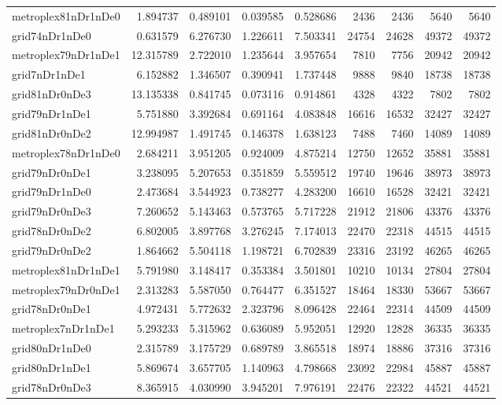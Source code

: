 \begin{longtable}{|l|r|r|r|r|r|r|r|r|}
metroplex81nDr1nDe0 & 1.894737 & 0.489101 & 0.039585 & 0.528686 & 2436 & 2436 & 5640 & 5640 \\
grid74nDr1nDe0 & 0.631579 & 6.276730 & 1.226611 & 7.503341 & 24754 & 24628 & 49372 & 49372 \\
metroplex79nDr1nDe1 & 12.315789 & 2.722010 & 1.235644 & 3.957654 & 7810 & 7756 & 20942 & 20942 \\
grid7nDr1nDe1 & 6.152882 & 1.346507 & 0.390941 & 1.737448 & 9888 & 9840 & 18738 & 18738 \\
grid81nDr0nDe3 & 13.135338 & 0.841745 & 0.073116 & 0.914861 & 4328 & 4322 & 7802 & 7802 \\
grid79nDr1nDe1 & 5.751880 & 3.392684 & 0.691164 & 4.083848 & 16616 & 16532 & 32427 & 32427 \\
grid81nDr0nDe2 & 12.994987 & 1.491745 & 0.146378 & 1.638123 & 7488 & 7460 & 14089 & 14089 \\
metroplex78nDr1nDe0 & 2.684211 & 3.951205 & 0.924009 & 4.875214 & 12750 & 12652 & 35881 & 35881 \\
grid79nDr0nDe1 & 3.238095 & 5.207653 & 0.351859 & 5.559512 & 19740 & 19646 & 38973 & 38973 \\
grid79nDr1nDe0 & 2.473684 & 3.544923 & 0.738277 & 4.283200 & 16610 & 16528 & 32421 & 32421 \\
grid79nDr0nDe3 & 7.260652 & 5.143463 & 0.573765 & 5.717228 & 21912 & 21806 & 43376 & 43376 \\
grid78nDr0nDe2 & 6.802005 & 3.897768 & 3.276245 & 7.174013 & 22470 & 22318 & 44515 & 44515 \\
grid79nDr0nDe2 & 1.864662 & 5.504118 & 1.198721 & 6.702839 & 23316 & 23192 & 46265 & 46265 \\
metroplex81nDr1nDe1 & 5.791980 & 3.148417 & 0.353384 & 3.501801 & 10210 & 10134 & 27804 & 27804 \\
metroplex79nDr0nDe1 & 2.313283 & 5.587050 & 0.764477 & 6.351527 & 18464 & 18330 & 53667 & 53667 \\
grid78nDr0nDe1 & 4.972431 & 5.772632 & 2.323796 & 8.096428 & 22464 & 22314 & 44509 & 44509 \\
metroplex7nDr1nDe1 & 5.293233 & 5.315962 & 0.636089 & 5.952051 & 12920 & 12828 & 36335 & 36335 \\
grid80nDr1nDe0 & 2.315789 & 3.175729 & 0.689789 & 3.865518 & 18974 & 18886 & 37316 & 37316 \\
grid80nDr1nDe1 & 5.869674 & 3.657705 & 1.140963 & 4.798668 & 23092 & 22984 & 45887 & 45887 \\
grid78nDr0nDe3 & 8.365915 & 4.030990 & 3.945201 & 7.976191 & 22476 & 22322 & 44521 & 44521 \\

\end{longtable}
